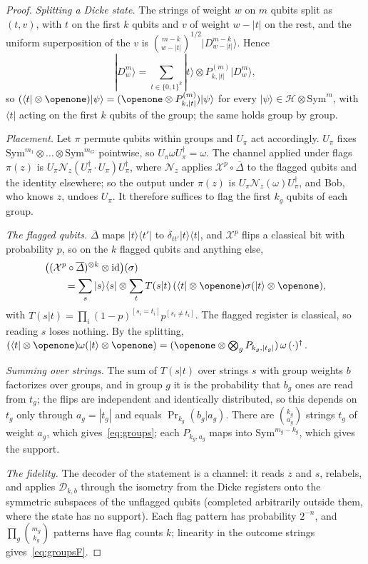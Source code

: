 \documentclass[aps,pra,twocolumn,superscriptaddress,nofootinbib,longbibliography,floatfix]{revtex4-2}
\newcommand{\ket}[1]{|#1\rangle}
\newcommand{\bra}[1]{\langle #1|}
\newcommand{\proj}[1]{|#1\rangle\langle #1|}
\newcommand{\deph}{\overline{\varDelta}}
\newcommand{\sym}{\mathrm{Sym}}
\newcommand{\id}{\mathrm{id}}
\newcommand{\dk}[2]{\ket{D^{#1}_{#2}}}
\newcommand{\prk}{\operatorname{Pr}}
\begin{document}
\begin{proof}
\emph{Splitting a Dicke state.} The strings of weight $w$ on $m$ qubits split as $(t,v)$, with $t$ on the first $k$ qubits and $v$ of weight $w-|t|$ on the rest, and the uniform superposition of the $v$ is $\binom{m-k}{w-|t|}^{1/2}\dk{m-k}{w-|t|}$. Hence
\[
\dk mw=\sum_{t\in\{0,1\}^k}\ket t\otimes P^{(m)}_{k,|t|}\dk mw,
\]
so $(\bra t\otimes\openone)\ket\psi=(\openone\otimes P^{(m)}_{k,|t|})\ket\psi$ for every $\ket\psi\in\mathcal H\otimes\sym^m$, with $\bra t$ acting on the first $k$ qubits of the group; the same holds group by group.

\emph{Placement.} Let $\pi$ permute qubits within groups and $U_\pi$ act accordingly. $U_\pi$ fixes $\sym^{m_1}\otimes\dots\otimes\sym^{m_G}$ pointwise, so $U_\pi\omega U_\pi^\dagger=\omega$. The channel applied under flags $\pi(z)$ is $U_\pi\mathcal N_z(U_\pi^\dagger\cdot U_\pi)U_\pi^\dagger$, where $\mathcal N_z$ applies $\mathcal X^p\circ\deph$ to the flagged qubits and the identity elsewhere; so the output under $\pi(z)$ is $U_\pi\mathcal N_z(\omega)U_\pi^\dagger$, and Bob, who knows $z$, undoes $U_\pi$. It therefore suffices to flag the first $k_g$ qubits of each group.

\emph{The flagged qubits.} $\deph$ maps $\ket t\!\bra{t'}$ to $\delta_{tt'}\ket t\!\bra t$, and $\mathcal X^p$ flips a classical bit with probability $p$, so on the $k$ flagged qubits and anything else,
\begin{align*}
&\bigl((\mathcal X^p\circ\deph)^{\otimes k}\otimes\id\bigr)(\sigma)\\
&\qquad=\sum_s\proj s\otimes\sum_tT(s|t)\,(\bra t\otimes\openone)\sigma(\ket t\otimes\openone),
\end{align*}
with $T(s|t)=\prod_i(1-p)^{[s_i=t_i]}p^{[s_i\ne t_i]}$. The flagged register is classical, so reading $s$ loses nothing. By the splitting, $(\bra t\otimes\openone)\omega(\ket t\otimes\openone)=(\openone\otimes\bigotimes_gP_{k_g,|t_g|})\,\omega\,(\cdot)^\dagger$.

\emph{Summing over strings.} The sum of $T(s|t)$ over strings $s$ with group weights $b$ factorizes over groups, and in group $g$ it is the probability that $b_g$ ones are read from $t_g$; the flips are independent and identically distributed, so this depends on $t_g$ only through $a_g=|t_g|$ and equals $\prk_{k_g}(b_g|a_g)$. There are $\binom{k_g}{a_g}$ strings $t_g$ of weight $a_g$, which gives~\eqref{eq:groups}; each $P_{k_g,a_g}$ maps into $\sym^{m_g-k_g}$, which gives the support.

\emph{The fidelity.} The decoder of the statement is a channel: it reads $z$ and $s$, relabels, and applies $\mathcal D_{k,b}$ through the isometry from the Dicke registers onto the symmetric subspaces of the unflagged qubits (completed arbitrarily outside them, where the state has no support). Each flag pattern has probability $2^{-n}$, and $\prod_g\binom{m_g}{k_g}$ patterns have flag counts $k$; linearity in the outcome strings gives~\eqref{eq:groupsF}.
\end{proof}
\end{document}
